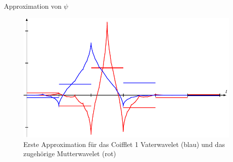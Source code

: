 \begin{loesung}
\begin{teilaufgaben}
Approximation von $\psi$
\qedhere
\end{teilaufgaben}
\begin{figure}
\centering
\includegraphics{chapters/uebungsaufgaben/07001-graph.pdf}
%
%
\caption{Erste Approximation für das Coifflet 1 Vaterwavelet (blau)
und das zugehörige Mutterwavelet (rot)
\label{07001:coifletimage}}
\end{figure}
\end{loesung}


